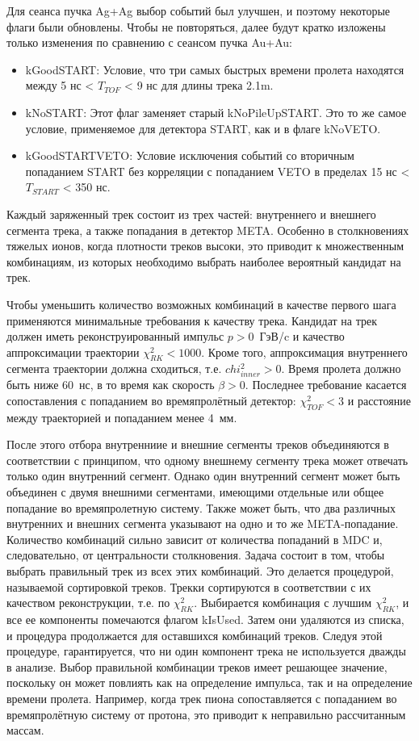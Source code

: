 Для сеанса пучка Ag+Ag выбор событий был улучшен, и поэтому некоторые флаги были обновлены. Чтобы не повторяться, далее будут кратко изложены только изменения по сравнению с сеансом пучка Au+Au:
\begin{itemize}
    \item kGoodSTART: Условие, что три самых быстрых времени пролета находятся между 5 нс < $T_{TOF}$ < 9 нс для длины трека 2.1m.
    \item kNoSTART: Этот флаг заменяет старый kNoPileUpSTART. Это то же самое условие, применяемое для детектора START, как и в флаге kNoVETO.
    \item kGoodSTARTVETO: Условие исключения событий со вторичным попаданием START без корреляции с попаданием VETO в пределах 15 нс < $T_{START}$ < 350 нс.
\end{itemize}

Каждый заряженный трек состоит из трех частей: внутреннего и внешнего сегмента трека, а также попадания в детектор META. 
Особенно в столкновениях тяжелых ионов, когда плотности треков высоки, это приводит к множественным комбинациям, из которых необходимо выбрать наиболее вероятный кандидат на трек.

Чтобы уменьшить количество возможных комбинаций в качестве первого шага применяются минимальные требования к качеству трека. 
Кандидат на трек должен иметь реконструированный импульс $p>0$~ГэВ/c и качество аппроксимации траектории $\chi^2_{RK} < 1000$. 
Кроме того, аппроксимация внутреннего сегмента траектории должна сходиться, т.е. $chi^2_{inner} > 0$. 
Время пролета должно быть ниже 60~нс, в то время как скорость $\beta>0$. 
Последнее требование касается сопоставления с попаданием во времяпролётный детектор: $\chi^2_{TOF}<3$ и расстояние между траекторией и попаданием менее 4~мм.

После этого отбора внутренниие и внешние сегменты треков объединяются в соответствии с принципом, что одному внешнему сегменту трека может отвечать только один внутренний сегмент. 
Однако один внутренний сегмент может быть объединен с двумя внешними сегментами, имеющими отдельные или общее попадание во времяпролетную систему.
Также может быть, что два различных внутренних и внешних сегмента указывают на одно и то же META-попадание. 
Количество комбинаций сильно зависит от количества попаданий в MDC и, следовательно, от центральности столкновения. 
Задача состоит в том, чтобы выбрать правильный трек из всех этих комбинаций. 
Это делается процедурой, называемой сортировкой треков. 
Трекки сортируются в соответствии с их качеством реконструкции, т.е. по $\chi^2_{RK}$. 
Выбирается комбинация с лучшим $\chi^2_{RK}$, и все ее компоненты помечаются флагом kIsUsed. 
Затем они удаляются из списка, и процедура продолжается для оставшихся комбинаций треков. 
Следуя этой процедуре, гарантируется, что ни один компонент трека не используется дважды в анализе. 
Выбор правильной комбинации треков имеет решающее значение, поскольку он может повлиять как на определение импульса, так и на определение времени пролета. 
Например, когда трек пиона сопоставляется с попаданием во времяпролётную систему от протона, это приводит к неправильно рассчитанным массам.

